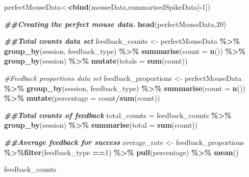 \documentclass[
]{article}
\newenvironment{Shaded}{\begin{snugshade}}{\end{snugshade}}
\newcommand{\AttributeTok}[1]{\textcolor[rgb]{0.13,0.29,0.53}{#1}}
\newcommand{\CommentTok}[1]{\textcolor[rgb]{0.56,0.35,0.01}{\textit{#1}}}
\newcommand{\DecValTok}[1]{\textcolor[rgb]{0.00,0.00,0.81}{#1}}
\newcommand{\DocumentationTok}[1]{\textcolor[rgb]{0.56,0.35,0.01}{\textbf{\textit{#1}}}}
\newcommand{\FunctionTok}[1]{\textcolor[rgb]{0.13,0.29,0.53}{\textbf{#1}}}
\newcommand{\NormalTok}[1]{#1}
\newcommand{\OtherTok}[1]{\textcolor[rgb]{0.56,0.35,0.01}{#1}}
\newcommand{\SpecialCharTok}[1]{\textcolor[rgb]{0.81,0.36,0.00}{\textbf{#1}}}
\begin{document}
\begin{Shaded}
\begin{Highlighting}[]
\NormalTok{perfectMouseData}\OtherTok{\textless{}{-}}\FunctionTok{cbind}\NormalTok{(mouseData,summarisedSpikeData[}\SpecialCharTok{{-}}\DecValTok{1}\NormalTok{])}



\DocumentationTok{\#\#Creating the perfect mouse data.}
\FunctionTok{head}\NormalTok{(perfectMouseData,}\DecValTok{20}\NormalTok{)}





\DocumentationTok{\#\#Total counts data set}
\NormalTok{feedback\_counts }\OtherTok{\textless{}{-}}\NormalTok{ perfectMouseData }\SpecialCharTok{\%\textgreater{}\%}
  \FunctionTok{group\_by}\NormalTok{(session, feedback\_type) }\SpecialCharTok{\%\textgreater{}\%}
  \FunctionTok{summarise}\NormalTok{(}\AttributeTok{count =} \FunctionTok{n}\NormalTok{()) }\SpecialCharTok{\%\textgreater{}\%} \FunctionTok{group\_by}\NormalTok{(session) }\SpecialCharTok{\%\textgreater{}\%} \FunctionTok{mutate}\NormalTok{(}\AttributeTok{totals =} \FunctionTok{sum}\NormalTok{(count))}

\CommentTok{\#Feedback proportions data set}
\NormalTok{feedback\_proportions }\OtherTok{\textless{}{-}}\NormalTok{ perfectMouseData }\SpecialCharTok{\%\textgreater{}\%}
  \FunctionTok{group\_by}\NormalTok{(session, feedback\_type) }\SpecialCharTok{\%\textgreater{}\%}
  \FunctionTok{summarise}\NormalTok{(}\AttributeTok{count =} \FunctionTok{n}\NormalTok{()) }\SpecialCharTok{\%\textgreater{}\%} \FunctionTok{mutate}\NormalTok{(}\AttributeTok{percentage =}\NormalTok{ count}\SpecialCharTok{/}\FunctionTok{sum}\NormalTok{(count))}


\DocumentationTok{\#\#Total counts of feedback}
\NormalTok{total\_counts }\OtherTok{=}\NormalTok{ feedback\_counts }\SpecialCharTok{\%\textgreater{}\%} \FunctionTok{group\_by}\NormalTok{(session) }\SpecialCharTok{\%\textgreater{}\%} \FunctionTok{summarise}\NormalTok{(}\AttributeTok{total =} \FunctionTok{sum}\NormalTok{(count))}

\DocumentationTok{\#\#Average feedback for success}
\NormalTok{average\_rate }\OtherTok{\textless{}{-}}\NormalTok{ feedback\_proportions }\SpecialCharTok{\%\textgreater{}\%}\FunctionTok{filter}\NormalTok{(feedback\_type }\SpecialCharTok{==}\DecValTok{1}\NormalTok{) }\SpecialCharTok{\%\textgreater{}\%} \FunctionTok{pull}\NormalTok{(percentage) }\SpecialCharTok{\%\textgreater{}\%} \FunctionTok{mean}\NormalTok{()}



\NormalTok{feedback\_counts }




\end{Highlighting}
\end{Shaded}
\end{document}
